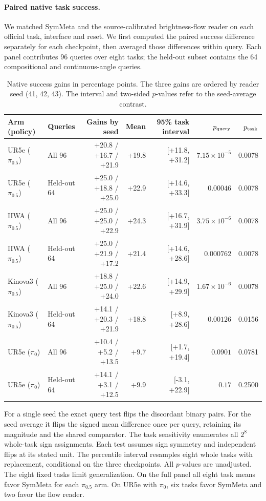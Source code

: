 \paragraph{Paired native task success.} We matched SymMeta and the source-calibrated brightness-flow reader on each official task, interface and reset. We first computed the paired success difference separately for each checkpoint, then averaged those differences within query. Each panel contributes 96 queries over eight tasks; the held-out subset contains the 64 compositional and continuous-angle queries.
\begin{table}[t]
\centering\small
\caption{Native success gains in percentage points. The three gains are ordered by reader seed (41, 42, 43). The interval and two-sided $p$-values refer to the seed-average contrast.}
\begin{tabular}{llrrrrr}
\hline
Arm (policy) & Queries & Gains by seed & Mean & 95\% task interval & $p_{\rm query}$ & $p_{\rm task}$ \\
\hline
UR5e ($\pi_{0.5}$) & All 96 & +20.8 / +16.7 / +21.9 & +19.8 & [+11.8, +31.2] & $7.15\times10^{-5}$ & 0.0078 \\
UR5e ($\pi_{0.5}$) & Held-out 64 & +25.0 / +18.8 / +25.0 & +22.9 & [+14.6, +33.3] & $0.00046$ & 0.0078 \\
IIWA ($\pi_{0.5}$) & All 96 & +25.0 / +25.0 / +22.9 & +24.3 & [+16.7, +31.9] & $3.75\times10^{-6}$ & 0.0078 \\
IIWA ($\pi_{0.5}$) & Held-out 64 & +25.0 / +21.9 / +17.2 & +21.4 & [+14.6, +28.6] & $0.000762$ & 0.0078 \\
Kinova3 ($\pi_{0.5}$) & All 96 & +18.8 / +25.0 / +24.0 & +22.6 & [+14.9, +29.9] & $1.67\times10^{-6}$ & 0.0078 \\
Kinova3 ($\pi_{0.5}$) & Held-out 64 & +14.1 / +20.3 / +21.9 & +18.8 & [+8.9, +28.6] & $0.00126$ & 0.0156 \\
UR5e ($\pi_0$) & All 96 & +10.4 / +5.2 / +13.5 & +9.7 & [+1.7, +19.4] & $0.0901$ & 0.0781 \\
UR5e ($\pi_0$) & Held-out 64 & +14.1 / +3.1 / +12.5 & +9.9 & [-3.1, +22.9] & $0.17$ & 0.2500 \\
\hline
\end{tabular}
\end{table}
For a single seed the exact query test flips the discordant binary pairs. For the seed average it flips the signed mean difference once per query, retaining its magnitude and the shared comparator. The task sensitivity enumerates all $2^8$ whole-task sign assignments. Each test assumes sign symmetry and independent flips at its stated unit. The percentile interval resamples eight whole tasks with replacement, conditional on the three checkpoints. All $p$-values are unadjusted. The eight fixed tasks limit generalization. On the full panel all eight task means favor SymMeta for each $\pi_{0.5}$ arm. On UR5e with $\pi_0$, six tasks favor SymMeta and two favor the flow reader.
